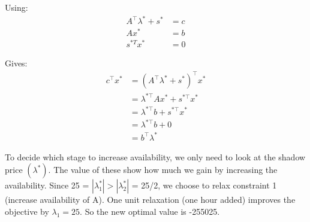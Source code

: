 \begin{minipage}[t]{0.3\textwidth}
  \centering
  Using: 
  \begin{align*}
    A^{\top}\lambda^* + s^* &= c \\
    Ax^* &= b \\ 
    s^{*T}x^* &= 0
  \end{align*}
\end{minipage}%
\hfill
\begin{minipage}[t]{0.7\textwidth}
  \centering Gives:
  \begin{align*}
    c^{\top}x^* &= (A^{\top}\lambda^*+s^*)^{\top}x^*  \\ 
    &= \lambda^{*\top}Ax^* + s^{*\top}x^* \\ 
    &= \lambda^{*\top}b + s^{*\top}x^*  \\ 
    &= \lambda^{*\top}b + 0 \\ 
    &= b^{\top}\lambda^*
  \end{align*}
\end{minipage}


To decide which stage to increase availability, we only need to look at the shadow price $(\lambda^*)$. The value of these show how much we 
gain by increasing the availability. Since 25 = $|\lambda_1^*|>|\lambda_2^*|$ = 25/2, we choose to relax constraint 1 (increase availability of A). One unit relaxation (one hour added) improves the
objective by $\lambda_1 = 25$. So the new optimal value is -255025. 
